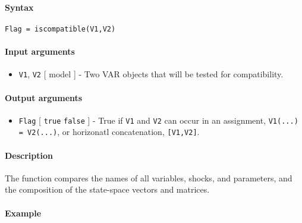


	\paragraph{Syntax}

\begin{verbatim}
Flag = iscompatible(V1,V2)
\end{verbatim}

\paragraph{Input arguments}

\begin{itemize}
\itemsep1pt\parskip0pt
\item
  \texttt{V1}, \texttt{V2} {[} model {]} - Two VAR objects that will be
  tested for compatibility.
\end{itemize}

\paragraph{Output arguments}

\begin{itemize}
\itemsep1pt\parskip0pt
\item
  \texttt{Flag} {[} \texttt{true} \textbar{} \texttt{false} {]} - True
  if \texttt{V1} and \texttt{V2} can occur in an assignment,
  \texttt{V1(...) = V2(...)}, or horizonatl concatenation,
  \texttt{{[}V1,V2{]}}.
\end{itemize}

\paragraph{Description}

The function compares the names of all variables, shocks, and
parameters, and the composition of the state-space vectors and matrices.

\paragraph{Example}


